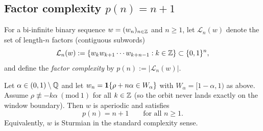 \subsection{Factor complexity \texorpdfstring{$p(n)=n+1$}{p(n)=n+1}}
\label{app:sturmian_complexity}
For a bi-infinite binary sequence $w=(w_n)_{n\in\mathbb{Z}}$ and $n\ge 1$,
let $\mathcal{L}_n(w)$ denote the set of length-$n$ factors (contiguous
subwords)
\[
\mathcal{L}_n(w):=\{w_k w_{k+1}\cdots w_{k+n-1}:k\in\mathbb{Z}\}\subset\{0,1\}^n,
\]
and define the \emph{factor complexity} by $p(n):=|\mathcal{L}_n(w)|$.

\begin{theorem}
\label{thm:sturmian_complexity}
Let $\alpha\in(0,1)\setminus\mathbb{Q}$ and let $w_n=\mathbf{1}\{\rho+n\alpha\in W_\alpha\}$
with $W_\alpha=[1-\alpha,1)$ as above.
Assume $\rho\not\equiv -k\alpha\ (\mathrm{mod}\ 1)$ for all $k\in\mathbb{Z}$
(so the orbit never lands exactly on the window boundary).
Then $w$ is aperiodic and satisfies
\begin{equation}
  p(n)=n+1\qquad\text{for all }n\ge 1.
\end{equation}
Equivalently, $w$ is Sturmian in the standard complexity sense.
\end{theorem}
